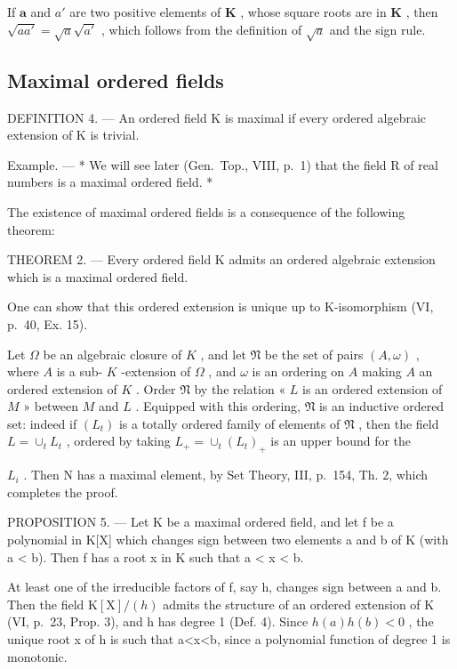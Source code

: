 If \(\pmb{a}\) and \(a'\) are two positive elements of \(\mathbf{K}\) , whose square roots are in \(\mathbf{K}\) , then \(\sqrt{aa'} = \sqrt{a}\sqrt{a'}\) , which follows from the definition of \(\sqrt{a}\) and the sign rule.

\subsection{Maximal ordered fields}

DEFINITION 4. --- An ordered field K is maximal if every ordered algebraic extension of K is trivial.

Example. --- * We will see later (Gen.~Top., VIII, p.~1) that the field R of real numbers is a maximal ordered field. *

The existence of maximal ordered fields is a consequence of the following theorem:

THEOREM 2. --- Every ordered field K admits an ordered algebraic extension which is a maximal ordered field.

One can show that this ordered extension is unique up to K-isomorphism (VI, p.~40, Ex. 15).

Let \(\Omega\) be an algebraic closure of \(K\) , and let \(\mathfrak{N}\) be the set of pairs \((A, \omega)\) , where \(A\) is a sub- \(K\) -extension of \(\Omega\) , and \(\omega\) is an ordering on \(A\) making \(A\) an ordered extension of \(K\) . Order \(\mathfrak{N}\) by the relation « \(L\) is an ordered extension of \(M\) » between \(M\) and \(L\) . Equipped with this ordering, \(\mathfrak{N}\) is an inductive ordered set: indeed if \((L_{t})\) is a totally ordered family of elements of \(\mathfrak{N}\) , then the field \(L = \cup_{t} L_{t}\) , ordered by taking \(L_{+} = \cup_{t} (L_{t})_{+}\) is an upper bound for the

\(L_{i}\) . Then N has a maximal element, by Set Theory, III, p.~154, Th. 2, which completes the proof.

PROPOSITION 5. --- Let K be a maximal ordered field, and let f be a polynomial in K{[}X{]} which changes sign between two elements a and b of K (with a \textless{} b). Then f has a root x in K such that a \textless{} x \textless{} b.

At least one of the irreducible factors of f, say h, changes sign between a and b. Then the field \(\mathrm{K}[\mathrm{X}]/(h)\) admits the structure of an ordered extension of K (VI, p.~23, Prop. 3), and h has degree 1 (Def. 4). Since \(h(a)h(b)<0\) , the unique root x of h is such that a\textless x\textless b, since a polynomial function of degree 1 is monotonic.

